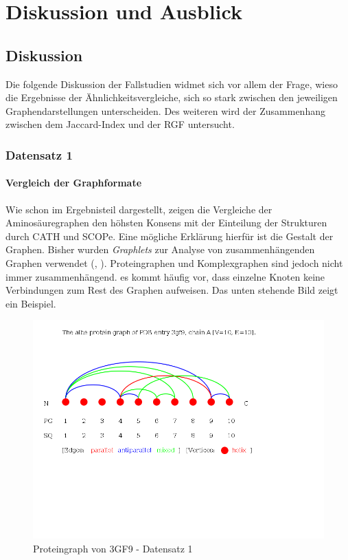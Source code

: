\documentclass{report}
\begin{document}
\chapter{Diskussion und Ausblick}



\section{Diskussion}

Die folgende Diskussion der Fallstudien widmet sich vor allem der Frage, wieso die Ergebnisse der \"Ahnlichkeitsvergleiche, sich so stark zwischen den jeweiligen Graphendarstellungen unterscheiden.
Des weiteren wird der Zusammenhang zwischen dem Jaccard-Index und der RGF untersucht.

\subsection{Datensatz 1}
\subsubsection{Vergleich der Graphformate}

Wie schon im Ergebnisteil dargestellt, zeigen die Vergleiche der Aminos\"auregraphen den h\"ohsten Konsens mit der Einteilung der Strukturen durch CATH und SCOPe. Eine m\"ogliche Erkl\"arung hierf\"ur ist die Gestalt der Graphen. Bisher wurden \textit{Graphlets} zur Analyse von zusammenh\"angenden Graphen verwendet (\cite{sherv_graphlets}, \cite{graphletfrequency}).
Proteingraphen und Komplexgraphen sind jedoch nicht immer zusammenh\"angend. es kommt h\"aufig vor, dass einzelne Knoten keine Verbindungen zum Rest des Graphen aufweisen. Das unten stehende Bild zeigt ein Beispiel.

\begin{figure}[h!]
\includegraphics[scale=0.5]{3gf9_A_albe_PG.png}
\caption{Proteingraph von 3GF9 - Datensatz 1}
\end{figure}
\end{document}
